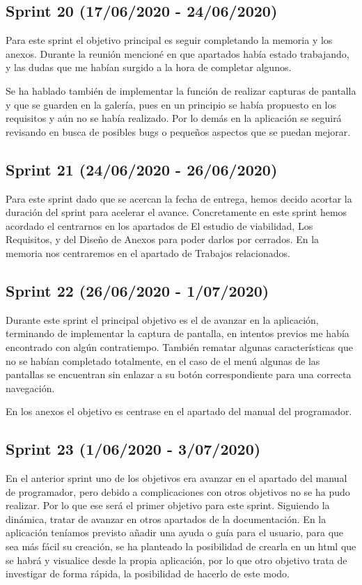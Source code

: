  \subsection{Sprint 20 (17/06/2020 - 24/06/2020)}
 Para este sprint el objetivo principal es seguir completando la memoria y los anexos. Durante la reunión mencioné en que apartados había estado trabajando, y las dudas que me habían surgido a la hora de completar algunos.
 
 Se ha hablado también de implementar la función de realizar capturas de pantalla y que se guarden en la galería, pues en un principio se había propuesto en los requisitos y aún no se había realizado. Por lo demás en la aplicación se seguirá revisando en busca de posibles bugs o pequeños aspectos que se puedan mejorar. 
 
  \subsection{Sprint 21 (24/06/2020 - 26/06/2020)}
 Para este sprint dado que se acercan la fecha de entrega, hemos decido acortar la duración del sprint para acelerar el avance.
 Concretamente en este sprint hemos acordado el centrarnos en los apartados de El estudio de viabilidad, Los Requisitos, y del Diseño de Anexos para poder darlos por cerrados. En la memoria nos centraremos en el apartado de Trabajos relacionados.
 
\subsection{Sprint 22 (26/06/2020 - 1/07/2020)}
Durante este sprint el principal objetivo es el de avanzar en la aplicación, terminando de implementar la captura de pantalla, en intentos previos me había encontrado con algún contratiempo. También rematar algunas características que no se habían completado totalmente, en el caso de el menú algunas de las pantallas se encuentran sin enlazar a su botón correspondiente para una correcta navegación.

 En los anexos el objetivo es centrase en el apartado del manual del programador.
  
\subsection{Sprint 23 (1/06/2020 - 3/07/2020)} 
En el anterior sprint uno de los objetivos era avanzar en el apartado del manual de programador, pero debido a complicaciones con otros objetivos no se ha pudo realizar. Por lo que ese será el primer objetivo para este sprint.
Siguiendo la dinámica, tratar de avanzar en otros apartados de la documentación.
En la aplicación teníamos previsto añadir una ayuda o guía para el usuario, para que sea más fácil su creación, se ha planteado la posibilidad de crearla en un html que se habrá y visualice desde la propia aplicación, por lo que otro objetivo trata de investigar de forma rápida, la posibilidad de hacerlo de este modo.
 
